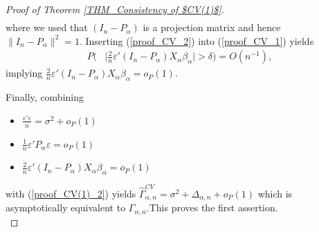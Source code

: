 \documentclass[Research_Module_ES.tex]{subfiles}
\begin{document}
\begin{proof}[Proof of Theorem \ref{THM_Consistency of $CV(1)$}]
\begin{align}
	\end{align}	 
	where we used that $(I_n-P_\alpha)$ is a projection matrix and hence $\lVert I_n-P_\alpha \rVert^2 = 1$.
	Inserting (\ref{proof_CV_2}) into (\ref{proof_CV_1}) yields
	\begin{align*}
	P\biggl(&\biggl|\frac{2}{n}\varepsilon'(I_n-P_\alpha)X_\alpha\beta_\alpha\biggr|>\delta\biggr) = O(n^{-1}),
	\end{align*}
	implying $\frac{2}{n}\varepsilon'(I_n-P_\alpha)X_\alpha\beta_\alpha=o_P(1)$. 
	
	Finally, combining 
	\begin{itemize}
	\item $\frac{\varepsilon'\varepsilon}{n} = \sigma^2 + o_P(1)$
	\item $\frac{1}{n}\varepsilon'P_\alpha\varepsilon = o_P(1)$
	\item $\frac{2}{n}\varepsilon'(I_n-P_\alpha)X_\alpha\beta_\alpha=o_P(1)$
	\end{itemize}
	with (\ref{proof_CV(1)_2}) yields $\hat{\Gamma}_{\alpha,n}^{CV} = \sigma^2 + \Delta_{\alpha,n} + o_P(1)$ which is asymptotically equivalent to $\Gamma_{\alpha,n}$.This proves the first assertion.\\
	

\end{proof}
\end{document}
